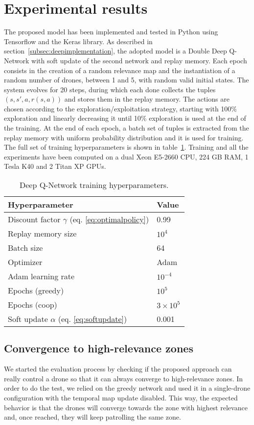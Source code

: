 \documentclass{article}
\begin{document}
\section{Experimental results}
\label{sec:results}

The proposed model has been implemented and tested in Python using Tensorflow and the Keras library. As described in section~\ref{subsec:deepimplementation}, the adopted model is a Double Deep Q-Network with soft update of the second network and replay memory. Each epoch consists in the creation of a random relevance map and the instantiation of a random number of drones, between 1 and 5, with random valid initial states. The system evolves for 20 steps, during which each done collects the tuples $(s, s', a, r(s,a))$ and stores them in the replay memory. The actions are chosen according to the exploration/exploitation strategy, starting with 100\% exploration and linearly decreasing it until 10\% exploration is used at the end of the training. At the end of each epoch, a batch set of tuples is extracted from the replay memory with uniform probability distribution and it is used for training. The full set of training hyperparameters is shown in table~\ref{tab:hyper}. Training and all the experiments have been computed on a dual Xeon E5-2660 CPU, 224 GB RAM, 1 Tesla K40 and 2 Titan XP GPUs. 
\begin{table}[]
	\centering
	\caption{Deep Q-Network training hyperparameters.}
	\label{tab:hyper}
	\begin{tabular}{ll}
		\toprule
		Hyperparameter & Value \\ \midrule
		Discount factor $\gamma$ (eq. \ref{eq:optimalpolicy}) & 0.99 \\
		Replay memory size & $10^4$ \\
		Batch size & 64 \\
		Optimizer & Adam \\
		Adam learning rate & $10^{-4}$ \\
		Epochs (greedy) & $10^5$ \\
		Epochs (coop) & $3\times 10^5$ \\
		Soft update $\alpha$ (eq. \ref{eq:softupdate}) & 0.001 \\%
	\end{tabular}
\end{table}

\subsection{Convergence to high-relevance zones}
We started the evaluation process by checking if the proposed approach can really control a drone so that it can always converge to high-relevance zones. In order to do the test, we relied on the greedy network and used it in a single-drone configuration with the temporal map update disabled. This way, the expected behavior is that the drones will converge towards the zone with highest relevance and, once reached, they will keep patrolling the same zone. 
\end{document}

